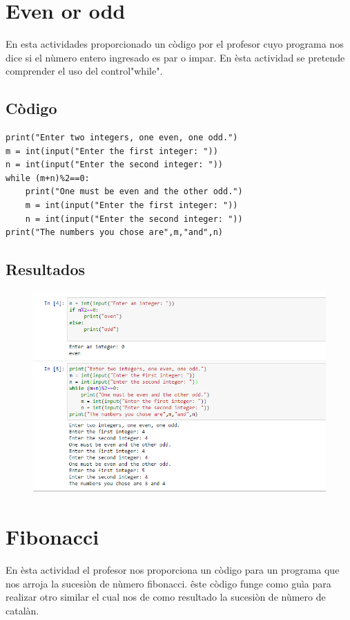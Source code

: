 \documentclass[12pt]{article}
\begin{document}
\section{Even or odd}
En esta actividades proporcionado un còdigo por el profesor cuyo programa nos dice si el nùmero entero ingresado es par o impar. En èsta actividad se pretende comprender el uso del control"while".
\subsection{Còdigo}

\begin{verbatim}
print("Enter two integers, one even, one odd.")
m = int(input("Enter the first integer: "))
n = int(input("Enter the second integer: "))
while (m+n)%2==0:
    print("One must be even and the other odd.")
    m = int(input("Enter the first integer: "))
    n = int(input("Enter the second integer: "))
print("The numbers you chose are",m,"and",n)

\end{verbatim}

\subsection{Resultados}

\begin{figure}[H]
\centering
\includegraphics[scale=.8]{evenodd}
\end{figure}

\pagebreak

\section{Fibonacci}
En èsta actividad el profesor nos proporciona un còdigo para un programa que nos arroja la sucesiòn de nùmero fibonacci. êste còdigo funge como guìa para realizar otro similar el cual nos de como resultado la sucesiòn de nùmero de catalàn.
\end{document}
